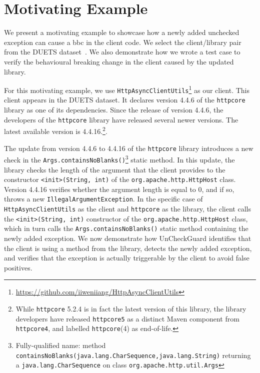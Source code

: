 \chapter{Motivating Example}\label{example}

We present a motivating example to showcase how a newly added unchecked exception can cause a \gls{bbc}
in the client code. We select the client/library pair from the DUETS dataset~\cite{durieux21:_duets}.
We also demonstrate how we wrote a test case to verify the behavioural breaking change in the client
caused by the updated library.

For this motivating example, we use \texttt{HttpAsyncClientUtils}\footnote{\url{https://github.com/iiweniiang/HttpAsyncClientUtils}}
as our client. This client appears in the DUETS dataset. It declares version 4.4.6 of the \texttt{httpcore}
library as one of its dependencies. Since the release of version 4.4.6, the developers of the \texttt{httpcore}
library have released several newer versions. The latest available version is 4.4.16.\footnote{While
\texttt{httpcore} 5.2.4 is in fact the latest version of this library, the library developers have
released \texttt{httpcore5} as a distinct Maven component from \texttt{httpcore4}, and labelled
\texttt{httpcore}(4) as end-of-life.}.

The update from version 4.4.6 to 4.4.16 of the \texttt{httpcore} library introduces a new check in
the \texttt{Args.containsNoBlanks()}\footnote{Fully-qualified name: method \texttt{containsNoBlanks(java.lang.CharSequence,java.lang.String)} returning a \texttt{java.lang.CharSequence}
on class \texttt{org.apache.http.util.Args}} static method. In this update, the library checks the
length of the argument that the client provides to the constructor \texttt{<init>(String, int)} of
the \texttt{org.apache.http.HttpHost} class. Version 4.4.16 verifies whether the argument length is
equal to 0, and if so, throws a new \texttt{IllegalArgumentException}. In the specific case of
\texttt{HttpAsyncClientUtils} as the client and \texttt{httpcore} as the library, the client calls
the \texttt{<init>(String, int)} constructor of the \texttt{org.apache.http.HttpHost} class, which
in turn calls the \texttt{Args.containsNoBlanks()} static method containing the newly added exception.
We now demonstrate how UnCheckGuard identifies that the client is using a method from the library,
detects the newly added exception, and verifies that the exception is actually triggerable by the
client to avoid false positives.

